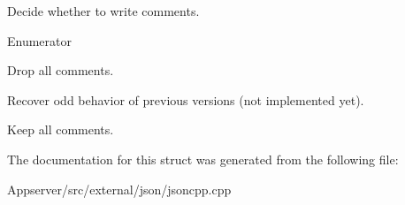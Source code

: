 Decide whether to write comments. 

\begin{Desc}
\item[Enumerator]\par
\begin{description}
\item[{\em 
None\hypertarget{structJson_1_1CommentStyle_a51fc08f3518fd81eba12f340d19a3d0cac8b32a8bae63414c8647d4919da8d437}{}\label{structJson_1_1CommentStyle_a51fc08f3518fd81eba12f340d19a3d0cac8b32a8bae63414c8647d4919da8d437}
}]Drop all comments. \item[{\em 
Most\hypertarget{structJson_1_1CommentStyle_a51fc08f3518fd81eba12f340d19a3d0cac65238f050773c107690a456e9c05c98}{}\label{structJson_1_1CommentStyle_a51fc08f3518fd81eba12f340d19a3d0cac65238f050773c107690a456e9c05c98}
}]Recover odd behavior of previous versions (not implemented yet). \item[{\em 
All\hypertarget{structJson_1_1CommentStyle_a51fc08f3518fd81eba12f340d19a3d0ca32302c0b97190c1808b3e38f367fef01}{}\label{structJson_1_1CommentStyle_a51fc08f3518fd81eba12f340d19a3d0ca32302c0b97190c1808b3e38f367fef01}
}]Keep all comments. \end{description}
\end{Desc}


The documentation for this struct was generated from the following file\+:\begin{DoxyCompactItemize}
\item 
Appserver/src/external/json/jsoncpp.\+cpp\end{DoxyCompactItemize}
